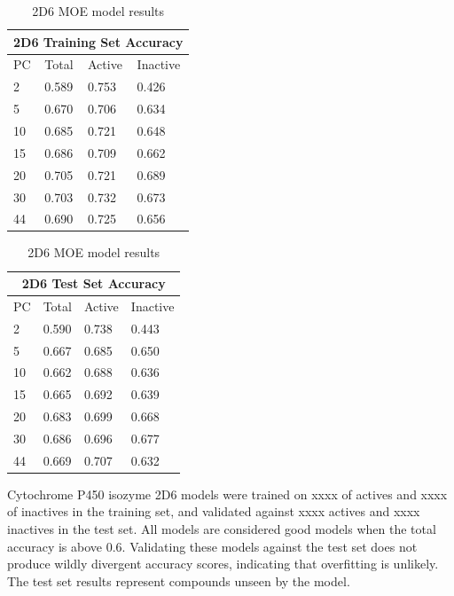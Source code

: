 \begin{table}[!h]
\begin{minipage}{.5\linewidth}
\centering
\begin{tabular}{|l|l|l|l|}
\hline
\multicolumn{4}{|c|}{2D6 Training Set Accuracy} \\ \hline
PC & Total          & Active          & Inactive\\ \hline
2  & 0.589          & 0.753           & 0.426   \\ \hline
5  & 0.670          & 0.706           & 0.634   \\ \hline
10 & 0.685          & 0.721           & 0.648   \\ \hline
15 & 0.686          & 0.709           & 0.662   \\ \hline
20 & 0.705          & 0.721           & 0.689   \\ \hline
30 & 0.703          & 0.732           & 0.673   \\ \hline
44 & 0.690          & 0.725           & 0.656   \\ \hline
\end{tabular}
\end{minipage}
\begin{minipage}{.5\linewidth}
\centering
\begin{tabular}{|l|l|l|l|}
\hline
\multicolumn{4}{|c|}{2D6 Test Set Accuracy}      \\ \hline
PC & Total          & Active          & Inactive \\ \hline
2  & 0.590          & 0.738           & 0.443    \\ \hline
5  & 0.667          & 0.685           & 0.650    \\ \hline
10 & 0.662          & 0.688           & 0.636    \\ \hline
15 & 0.665          & 0.692           & 0.639    \\ \hline
20 & 0.683          & 0.699           & 0.668    \\ \hline
30 & 0.686          & 0.696           & 0.677    \\ \hline
44 & 0.669          & 0.707           & 0.632    \\ \hline
\end{tabular}
\end{minipage}
\caption{2D6 MOE model results}
\end{table}

Cytochrome P450 isozyme 2D6 models were trained on xxxx of actives and xxxx of inactives in the training set, and validated against xxxx actives and xxxx inactives in the test set. All models are considered good models when the total accuracy is above 0.6. Validating these models against the test set does not produce wildly divergent accuracy scores, indicating that overfitting is unlikely. The test set results represent compounds unseen by the model. 

